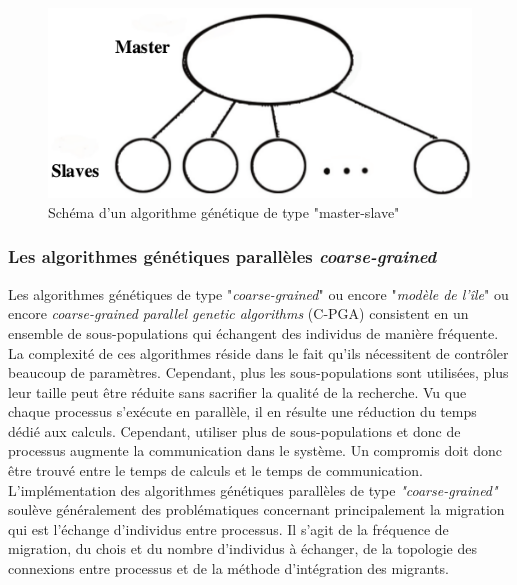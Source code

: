 	\begin{figure}[!h]
		\begin{center}
			\includegraphics[scale=.3]{images/master_slave_ga.png}
			\caption{Schéma d'un algorithme génétique de type "master-slave" \cite{cant}}
			\label{fig:master_slave_ga}
		\end{center}
	\end{figure}
 
	\subsubsection{Les algorithmes génétiques parallèles \emph{coarse-grained}}
	
	Les algorithmes génétiques de type "\emph{coarse-grained}" ou encore "\emph{modèle de l'île}" ou encore \emph{coarse-grained parallel genetic algorithms} (C-PGA) consistent en un ensemble de sous-populations qui échangent des individus de manière fréquente. La complexité de ces algorithmes réside dans le fait qu'ils nécessitent de contrôler beaucoup de paramètres. Cependant, plus les sous-populations sont utilisées, plus leur taille peut être réduite sans sacrifier la qualité de la recherche. Vu que chaque processus s'exécute en parallèle, il en résulte une réduction du temps dédié aux calculs. Cependant, utiliser plus de sous-populations et donc de processus augmente la communication dans le système. Un compromis doit donc être trouvé entre le temps de calculs et le temps de communication. L'implémentation des algorithmes génétiques parallèles de type \emph{"coarse-grained"} soulève généralement des problématiques concernant principalement la migration qui est l'échange d'individus entre processus. Il s'agit de la fréquence de migration, du chois et du nombre d'individus à échanger, de la topologie des connexions entre processus et de la méthode d'intégration des migrants.\\

